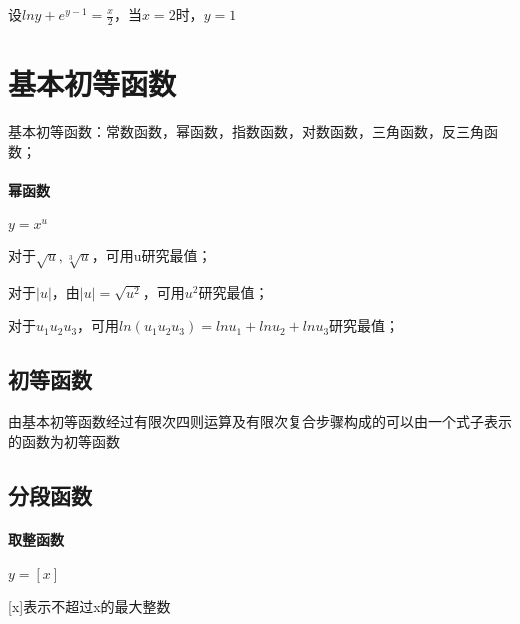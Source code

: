 设\(lny + e^{y - 1} = \frac{x}{2}\)，当\(x = 2\)时，\(y = 1\)


\section{基本初等函数}
基本初等函数：常数函数，幂函数，指数函数，对数函数，三角函数，反三角函数；
\paragraph{幂函数}
\(y = x^u\)

对于\(\sqrt{u},\sqrt[3]{u}\)，可用u研究最值；

对于\(|u|\)，由\(|u| = \sqrt{u^2}\)，可用\(u^2\)研究最值；

对于\(u_1u_2u_3\)，可用\(ln(u_1u_2u_3) = lnu_1 + lnu_2 + lnu_3\)研究最值；


\subsection{初等函数}
由基本初等函数经过有限次四则运算及有限次复合步骤构成的可以由一个式子表示的函数为初等函数


\subsection{分段函数}

\paragraph{取整函数}
\(y = [x]\)

[x]表示不超过x的最大整数









